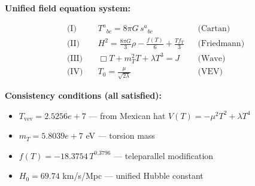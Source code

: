 
\textbf{Unified field equation system:}

\begin{align}
  \text{(I)} \quad & T^a{}_{bc} = 8\pi G \, s^a{}_{bc} && \text{(Cartan)} \\
  \text{(II)} \quad & H^2 = \frac{8\pi G}{3}\rho - \frac{f(T)}{6} + \frac{Tf_T}{3} && \text{(Friedmann)} \\
  \text{(III)} \quad & \Box T + m_T^2 T + \lambda T^3 = J && \text{(Wave)} \\
  \text{(IV)} \quad & T_0 = \frac{\mu}{\sqrt{2\lambda}} && \text{(VEV)}
\end{align}

\textbf{Consistency conditions (all satisfied):}
\begin{itemize}
  \item $T_{\text{vev}} = 2.5256e+7$ — from Mexican hat $V(T) = -\mu^2 T^2 + \lambda T^4$
  \item $m_T = 5.8039e+7$ eV — torsion mass
  \item $f(T) = -18.3754 \, T^{0.3796}$ — teleparallel modification
  \item $H_0 = 69.74$ km/s/Mpc — unified Hubble constant
\end{itemize}
